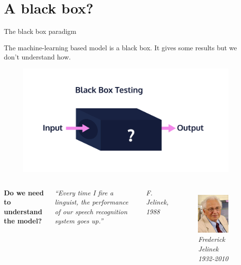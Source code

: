 \documentclass[handout]{beamer}
\newcommand{\rref}[1][]{\hfill{\scriptsize\textit{#1}}}
\begin{document}
\section{A black box?}
\begin{frame}{The black box paradigm}

The machine-learning based model is a \alert{black box}. It gives some results but we don't understand how.
\begin{figure}
    \centering
    \includegraphics[width=.4\textwidth]{fig/L3/blackBox.png}

\end{figure}

\begin{columns}
{\bf Do we need to understand the model?}

\pause
{\it``Every time I fire a linguist, the performance of our speech recognition system goes up.''}

\rref[F. Jelinek, 1988]
\begin{figure}
\includegraphics[width=.4\textwidth]{fig/L3/jelinek.jpeg}\\
  {\small {\it Frederick Jelinek 1932-2010}}
\end{figure}
\end{columns}

\end{frame}
\end{document}
